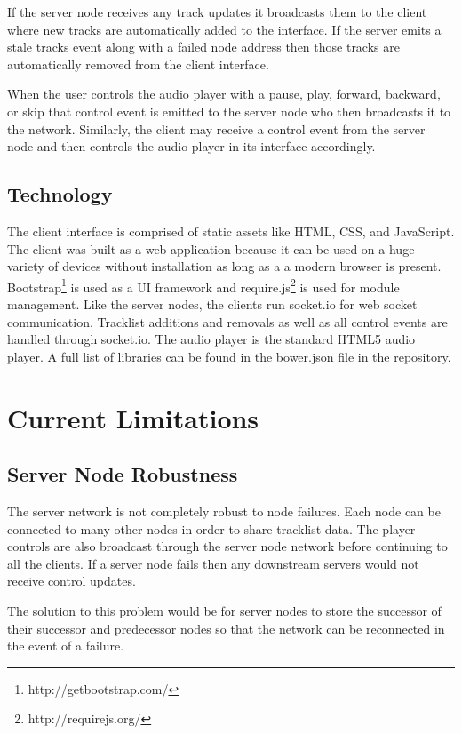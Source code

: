 \documentclass[12pt]{article}
\begin{document}
If the server node receives any track updates it broadcasts them to the client where new tracks are automatically added to the interface. If the server emits a stale tracks event along with a failed node address then those tracks are automatically removed from the client interface.

When the user controls the audio player with a pause, play, forward, backward, or skip that control event is emitted to the server node who then broadcasts it to the network. Similarly, the client may receive a control event from the server node and then controls the audio player in its interface accordingly.

\subsection{Technology}
The client interface is comprised of static assets like HTML, CSS, and JavaScript. The client was built as a web application because it can be used on a huge variety of devices without installation as long as a a modern browser is present. Bootstrap\footnote{http://getbootstrap.com/} is used as a UI framework and require.js\footnote{http://requirejs.org/} is used for module management. Like the server nodes, the clients run socket.io for web socket communication. Tracklist additions and removals as well as all control events are handled through socket.io. The audio player is the standard HTML5 audio player. A full list of libraries can be found in the bower.json file in the repository.

\section{Current Limitations}

\subsection{Server Node Robustness}
The server network is not completely robust to node failures. Each node can be connected to many other nodes in order to share tracklist data. The player controls are also broadcast through the server node network before continuing to all the clients. If a server node fails then any downstream servers would not receive control updates.

The solution to this problem would be for server nodes to store the successor of their successor and predecessor nodes so that the network can be reconnected in the event of a failure.
\end{document}
